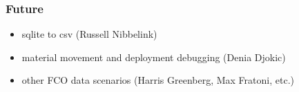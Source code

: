 \begin{frame}[fragile]
\frametitle{Future}
\begin{itemize}
\item sqlite to csv (Russell Nibbelink) 
\item material movement and deployment debugging (Denia Djokic)
\item other FCO data scenarios (Harris Greenberg, Max Fratoni, etc.)
\end{itemize}
\end{frame}
